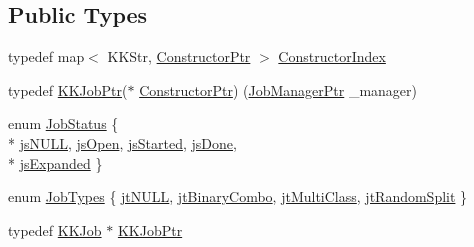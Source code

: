 \subsection*{Public Types}
\begin{DoxyCompactItemize}
\item 
typedef map$<$ K\+K\+Str, \hyperlink{class_k_k_job_managment_1_1_k_k_job_aaa663a535573601302dd8bc1ead56485}{Constructor\+Ptr} $>$ \hyperlink{class_k_k_job_managment_1_1_k_k_job_a95e80219c377acb27706c313c4d41827}{Constructor\+Index}
\item 
typedef \hyperlink{class_k_k_job_managment_1_1_k_k_job_a53526e4ffe4ab2b7858f79ab0ed65a1d}{K\+K\+Job\+Ptr}($\ast$ \hyperlink{class_k_k_job_managment_1_1_k_k_job_aaa663a535573601302dd8bc1ead56485}{Constructor\+Ptr}) (\hyperlink{namespace_k_k_job_managment_aa12a7270f9983ca4ed916533dc8adbc4}{Job\+Manager\+Ptr} \+\_\+manager)
\item 
enum \hyperlink{class_k_k_job_managment_1_1_k_k_job_afbd631ac794da7bbb00e0406ba89bac4}{Job\+Status} \{ \\*
\hyperlink{class_k_k_job_managment_1_1_k_k_job_afbd631ac794da7bbb00e0406ba89bac4aea243f8d966fa6b5c37151b483d4a6d3}{js\+N\+U\+LL}, 
\hyperlink{class_k_k_job_managment_1_1_k_k_job_afbd631ac794da7bbb00e0406ba89bac4a43e687d064644b4fabf768877c544f27}{js\+Open}, 
\hyperlink{class_k_k_job_managment_1_1_k_k_job_afbd631ac794da7bbb00e0406ba89bac4aa844eb2d687af6916f49354626a58974}{js\+Started}, 
\hyperlink{class_k_k_job_managment_1_1_k_k_job_afbd631ac794da7bbb00e0406ba89bac4adb6ce8574820736dbaa3b0ae115057d2}{js\+Done}, 
\\*
\hyperlink{class_k_k_job_managment_1_1_k_k_job_afbd631ac794da7bbb00e0406ba89bac4a646ee7eb2e67a85d9119f90d5c1a1517}{js\+Expanded}
 \}
\item 
enum \hyperlink{class_k_k_job_managment_1_1_k_k_job_acb39124f5d31008eba2476942ff0752a}{Job\+Types} \{ \hyperlink{class_k_k_job_managment_1_1_k_k_job_acb39124f5d31008eba2476942ff0752aab75576633674da8196d9169811fe4604}{jt\+N\+U\+LL}, 
\hyperlink{class_k_k_job_managment_1_1_k_k_job_acb39124f5d31008eba2476942ff0752aaa084b67408326bce745eb67d80c335c6}{jt\+Binary\+Combo}, 
\hyperlink{class_k_k_job_managment_1_1_k_k_job_acb39124f5d31008eba2476942ff0752aa6ca2eebe03a8de6a836ab9a4606d5b5e}{jt\+Multi\+Class}, 
\hyperlink{class_k_k_job_managment_1_1_k_k_job_acb39124f5d31008eba2476942ff0752aa1cbc6cf1e930fe184751849a36049421}{jt\+Random\+Split}
 \}
\item 
typedef \hyperlink{class_k_k_job_managment_1_1_k_k_job}{K\+K\+Job} $\ast$ \hyperlink{class_k_k_job_managment_1_1_k_k_job_a53526e4ffe4ab2b7858f79ab0ed65a1d}{K\+K\+Job\+Ptr}
\end{DoxyCompactItemize}
